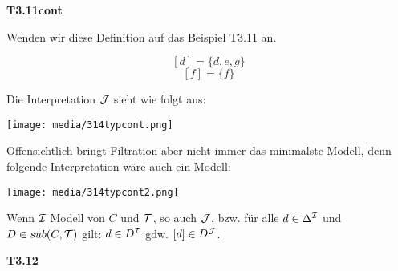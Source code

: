 \textbf{T3.11cont}

Wenden wir diese Definition auf das Beispiel T3.11 an.

$$[d]=\{d,e,g\}$$
$$[f]=\{f\}$$

Die Interpretation $\mathcal{J}$ sieht wie folgt aus:

\texttt{[image: media/314typcont.png]}

Offensichtlich bringt Filtration aber nicht immer das minimalste Modell, denn folgende Interpretation wäre auch ein Modell:

\texttt{[image: media/314typcont2.png]}

\begin{theorem} 
Wenn $\mathcal{I}$ Modell von $C$ und $\mathcal{T}$, so auch $\mathcal{J}$, bzw. für alle
$d \in \Delta^{\mathcal{I}}$ und $D \in sub(C,\mathcal{T})$ gilt: $d \in D^{\mathcal{I}}$ gdw.
$\left\lbrack d \right\rbrack \in D^{\mathcal{J}}$.
\end{theorem}

\textbf{T3.12}

